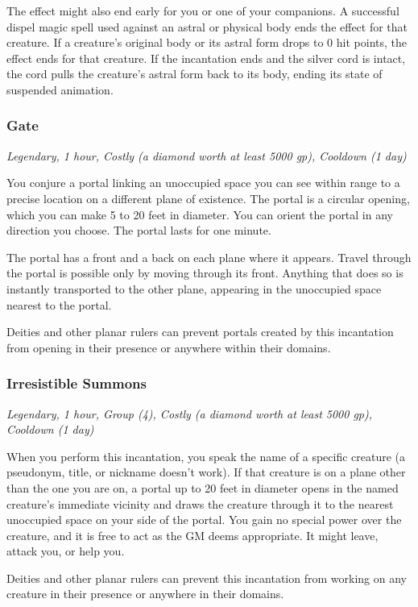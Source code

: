 The effect might also end early for you or one of your companions. A successful dispel magic spell used against an astral or physical body ends the effect for that creature. If a creature's original body or its astral form drops to 0 hit points, the effect ends for that creature. If the incantation ends and the silver cord is intact, the cord pulls the creature's astral form back to its body, ending its state of suspended animation.

\subsubsection{Gate}
\textit{Legendary, 1 hour, Costly (a diamond worth at least 5000 gp), Cooldown (1 day)}

You conjure a portal linking an unoccupied space you can see within range to a precise location on a different plane of existence. The portal is a circular opening, which you can make 5 to 20 feet in diameter. You can orient the portal in any direction you choose. The portal lasts for one minute.

The portal has a front and a back on each plane where it appears. Travel through the portal is possible only by moving through its front. Anything that does so is instantly transported to the other plane, appearing in the unoccupied space nearest to the portal.

Deities and other planar rulers can prevent portals created by this incantation from opening in their presence or anywhere within their domains.

\subsubsection{Irresistible Summons}
\textit{Legendary, 1 hour, Group (4), Costly (a diamond worth at least 5000 gp), Cooldown (1 day)}

When you perform this incantation, you speak the name of a specific creature (a pseudonym, title, or nickname doesn't work). If that creature is on a plane other than the one you are on, a portal up to 20 feet in diameter opens in the named creature's immediate vicinity and draws the creature through it to the nearest unoccupied space on your side of the portal. You gain no special power over the creature, and it is free to act as the GM deems appropriate. It might leave, attack you, or help you.

Deities and other planar rulers can prevent this incantation from working on any creature in their presence or anywhere in their domains.

